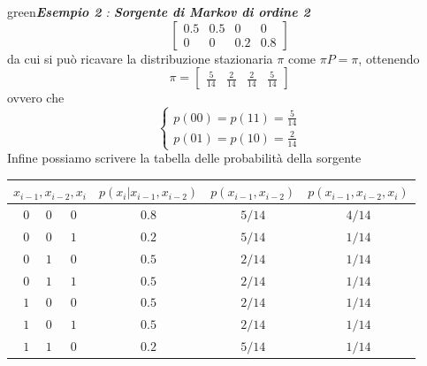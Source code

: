 \begin{mybox}[breakable]{green}{\textit{\textbf{Esempio 2} : \textbf{Sorgente di Markov di ordine 2}}}
\begin{equation*}
\begin{bmatrix}
    0.5 & 0.5 & 0 & 0 \\
    0 & 0 & 0.2 & 0.8
    \end{bmatrix}
\end{equation*}
da cui si pu\`o ricavare la distribuzione stazionaria $\pi$ come $\pi P = \pi$, ottenendo
\begin{equation*}
    \pi = \begin{bmatrix} \frac{5}{14} & \frac{2}{14} & \frac{2}{14} & \frac{5}{14} \end{bmatrix}
\end{equation*}
ovvero che
\begin{equation*}
    \begin{cases}
        p(00) = p(11) = \frac{5}{14} \\
        p(01) = p(10) = \frac{2}{14}
    \end{cases}
\end{equation*}
Infine possiamo scrivere la tabella delle probabilit\`a della sorgente
\begin{table}[H]
    \centering
    \begin{tabular}{cccc}
    \toprule
    $x_{i-1},x_{i-2},x_i$ & $p(x_i|x_{i-1},x_{i-2})$ & $p(x_{i-1},x_{i-2})$ & $p(x_{i-1},x_{i-2},x_i)$ \\
    \midrule
    $0\hspace{16pt}0\hspace{18pt}0$ & $0.8$ & $5/14$ & $4/14$ \\
    $0\hspace{16pt}0\hspace{18pt}1$ & $0.2$ & $5/14$ & $1/14$ \\
    $0\hspace{16pt}1\hspace{18pt}0$ & $0.5$ & $2/14$ & $1/14$ \\
    $0\hspace{16pt}1\hspace{18pt}1$ & $0.5$ & $2/14$ & $1/14$ \\
    $1\hspace{16pt}0\hspace{18pt}0$ & $0.5$ & $2/14$ & $1/14$ \\
    $1\hspace{16pt}0\hspace{18pt}1$ & $0.5$ & $2/14$ & $1/14$ \\
    $1\hspace{16pt}1\hspace{18pt}0$ & $0.2$ & $5/14$ & $1/14$ \\

\end{tabular}
\end{table}
\end{mybox}
